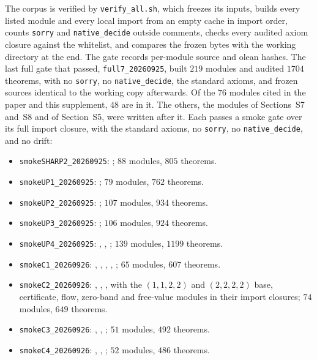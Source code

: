 The corpus is verified by \texttt{verify\_all.sh}, which freezes its inputs, builds every
listed module and every local import from an empty cache in import order, counts
\texttt{sorry} and \texttt{native\_decide} outside comments, checks every audited axiom
closure against the whitelist, and compares the frozen bytes with the working directory at
the end. The gate records per-module source and olean hashes. The last full gate that passed,
\texttt{full7\_20260925}, built $219$ modules and audited $1704$ theorems, with no
\texttt{sorry}, no \texttt{native\_decide}, the standard axioms, and frozen sources identical to
the working copy afterwards. Of the $76$ modules cited in the paper and this supplement, $48$ are
in it. The others, the modules of Sections~S7 and~S8 and  of
Section~S5, were written after it. Each passes a smoke gate over its full import closure, with the
standard axioms, no \texttt{sorry}, no \texttt{native\_decide}, and no drift:
\begin{itemize}
\item \texttt{smokeSHARP2\_20260925}: ; $88$ modules, $805$ theorems.
\item \texttt{smokeUP1\_20260925}: ; $79$ modules, $762$ theorems.
\item \texttt{smokeUP2\_20260925}: ; $107$ modules, $934$ theorems.
\item \texttt{smokeUP3\_20260925}: ; $106$ modules, $924$ theorems.
\item \texttt{smokeUP4\_20260925}: , ,
; $139$ modules, $1199$ theorems.
\item \texttt{smokeC1\_20260926}: , ,
, , ;
$65$ modules, $607$ theorems.
\item \texttt{smokeC2\_20260926}: , ,
, with the $(1,1,2,2)$ and $(2,2,2,2)$ base, certificate, flow,
zero-band and free-value modules in their import closures; $74$ modules, $649$ theorems.
\item \texttt{smokeC3\_20260926}: , ,
; $51$ modules, $492$ theorems.
\item \texttt{smokeC4\_20260926}: , ,
; $52$ modules, $486$ theorems.
\end{itemize}



